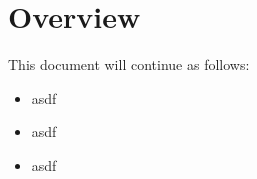 \section{Overview}

This document will continue as follows:

\begin{itemize}
    \item asdf
    \item asdf
    \item asdf
\end{itemize}